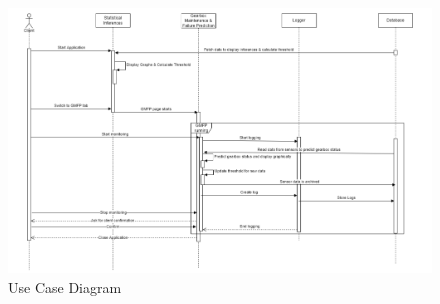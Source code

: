 
\label{sec:seq-dia}
\begin{figure}
	\centering
	\includegraphics[width=1.2\linewidth]{images/sequence-diagram.png}
	\caption{Use Case Diagram}
\end{figure} 